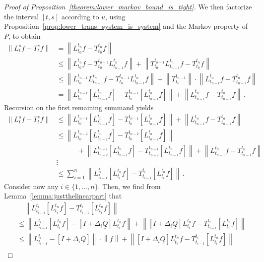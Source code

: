 \documentclass[10pt,a4paper]{paper}
\theoremstyle{definition}
\newcommand{\lrate}{\underline{Q}}
\newcommand{\norm}[1]{\left\lVert #1 \right\rVert}
\begin{document}
\begin{proof}[Proof of Proposition~\ref{theorem:lower_markov_bound_is_tight}]
We then factorize the interval $[t,s]$ according to $u$, using Proposition~\ref{prop:lower_trans_system_is_system} and the Markov property of $P$, to obtain
\begin{align*}
\norm{L_t^sf - T_t^sf} &= \norm{L_{t_0}^{t_n}f - T_{t_0}^{t_n}f} \\
 &\leq \norm{L_{t_0}^{t_n}f - T_{t_0}^{t_{n-1}}L_{t_{n-1}}^{t_n}f} + \norm{T_{t_0}^{t_{n-1}}L_{t_{n-1}}^{t_n}f - T_{t_0}^{t_n}f} \\
 &\leq \norm{L_{t_0}^{t_{n-1}}L_{t_{n-1}}^{t_n}f - T_{t_0}^{t_{n-1}}L_{t_{n-1}}^{t_n}f} + \norm{{T_{t_0}^{t_{n-1}}}}\cdot\norm{L_{t_{n-1}}^{t_n}f - T_{t_{n-1}}^{t_n}f} \\
 &= \norm{L_{t_0}^{t_{n-1}}\left[L_{t_{n-1}}^{t_n}f\right] - T_{t_0}^{t_{n-1}}\left[L_{t_{n-1}}^{t_n}f\right]} + \norm{L_{t_{n-1}}^{t_n}f - T_{t_{n-1}}^{t_n}f} \,.
\end{align*}
Recursion on the first remaining summand yields
\begin{align*}
\norm{L_t^sf - T_t^sf} &\leq \norm{L_{t_0}^{t_{n-1}}\left[L_{t_{n-1}}^{t_n}f\right] - T_{t_0}^{t_{n-1}}\left[L_{t_{n-1}}^{t_n}f\right]} + \norm{L_{t_{n-1}}^{t_n}f - T_{t_{n-1}}^{t_n}f} \\
 &\leq \norm{L_{t_0}^{t_{n-2}}\left[L_{t_{n-2}}^{t_n}f\right] - T_{t_0}^{t_{n-2}}\left[L_{t_{n-2}}^{t_n}f\right]} \\
 &\quad\quad\quad+ \norm{L_{t_{n-2}}^{t_{n-1}}\left[L_{t_{n-1}}^{t_n}f\right] - T_{t_{n-2}}^{t_{n-1}}\left[L_{t_{n-1}}^{t_n}f\right]} + \norm{L_{t_{n-1}}^{t_n}f - T_{t_{n-1}}^{t_n}f} \\
&\vdots \\
 &\leq \sum_{i=1}^{n} \norm{L_{t_{i-1}}^{t_i}\left[L_{t_i}^{t_n}f\right] - T_{t_{i-1}}^{t_i}\left[L_{t_i}^{t_n}f\right]}\,.
\end{align*}
Consider now any $i\in\{1,\ldots,n\}$. Then, we find from Lemma~\ref{lemma:justthelinearpart} that
\begin{align*}
&\quad \norm{L_{t_{i-1}}^{t_i}\left[L_{t_i}^{t_n}f\right] - T_{t_{i-1}}^{t_i}\left[L_{t_i}^{t_n}f\right]} \\
&\leq \norm{L_{t_{i-1}}^{t_i}\left[L_{t_i}^{t_n}f\right] - \left[I+\Delta_i\lrate\right]L_{t_i}^{t_n}f} + \norm{\left[I+\Delta_i\lrate\right]L_{t_i}^{t_n}f - T_{t_{i-1}}^{t_i}\left[L_{t_i}^{t_n}f\right]} \\
&\leq \norm{L_{t_{i-1}}^{t_i} - \left[I+\Delta_i\lrate\right]}\cdot\norm{f} + \norm{\left[I+\Delta_i\lrate\right]L_{t_i}^{t_n}f - T_{t_{i-1}}^{t_i}\left[L_{t_i}^{t_n}f\right]} \\

\end{align*}
\end{proof}
\end{document}
